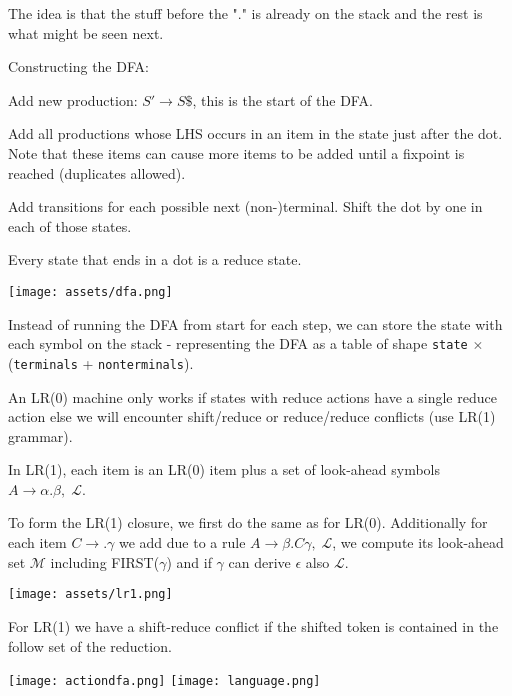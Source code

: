 The idea is that the stuff before the "." is already on the stack and the rest is what might be seen next. \medskip

Constructing the DFA:
\begin{compactitem}[$\quad\bullet$]
	\item Add new production: $S' \to S\$$, this is the start of the DFA.

	\item Add all productions whose LHS occurs in an item in the state just after the dot. Note that these items can cause more items to be added until a fixpoint is reached (duplicates allowed).

	\item Add transitions for each possible next (non-)terminal. Shift the dot by one in each of those states.

	\item Every state that ends in a dot is a reduce state.
\end{compactitem}
\vspace{-10pt}
\begin{center}
	\texttt{[image: assets/dfa.png]}
\end{center}
\vspace{-10pt}

Instead of running the DFA from start for each step, we can store the state with each symbol on the stack - representing the DFA as a table of shape \texttt{state} $\times$ (\texttt{terminals} + \texttt{nonterminals}). \medskip

An LR(0) machine only works if states with reduce actions have a single reduce action else we will encounter shift/reduce or reduce/reduce conflicts (use LR(1) grammar). \medskip

In LR(1), each item is an LR(0) item plus a set of look-ahead symbols $A \to \alpha . \beta, \; \mathcal L$.\medskip

To form the LR(1) closure, we first do the same as for LR(0). Additionally for each item $C \to . \gamma$ we add due to a rule $A \to \beta . C \gamma, \; \mathcal L$, we compute its look-ahead set $\mathcal M$ including FIRST($\gamma$) and if $\gamma$ can derive $\epsilon$ also $\mathcal L$. \medskip

\vspace{-15pt}
\begin{center}
	\texttt{[image: assets/lr1.png]}
\end{center}
\vspace{-10pt}
For LR(1) we have a shift-reduce conflict if the shifted token is contained in the follow set of the reduction.

\begin{multicols*}{2}
	\texttt{[image: actiondfa.png]}
	\texttt{[image: language.png]}
\end{multicols*}
